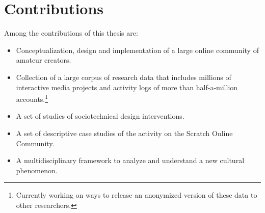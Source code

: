 \section{Contributions}

Among the contributions of this thesis are:
\begin{itemize}
\item Conceptualization, design and implementation of a large online community of amateur creators.
\item Collection of a large corpus of research data that includes millions of interactive media projects and activity logs of more than half-a-million accounts.\footnote{Currently working on ways to release an anonymized version of these data to other researchers.}
\item A set of studies of sociotechnical design interventions.
\item A set of descriptive case studies of the activity on the Scratch Online Community.
\item A multidisciplinary framework to analyze and understand a new cultural phenomenon.
\end{itemize}
